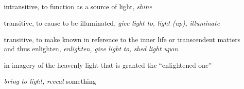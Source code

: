 			\subparagraph{\texorpdfstring{}{}}
				\label{PHOTIZO}
			
				\begin{compactdesc}
					\item[BDAG 955b] \textbf{}
						\begin{compactitem}
							\item[1] intransitive, to function as a source of light, \textit{shine}
							\item[2] transitive, to cause to be illuminated, \textit{give light to, light (up), illuminate}
							\item[3] transitive, to make known in reference to the inner life or transcendent matters and thus enlighten, \textit{enlighten, give light to, shed light upon}
							\item[3a] in imagery of the heavenly light that is granted the ``enlightened one''
							\item[3b] \textit{bring to light, reveal} something
						\end{compactitem}
				\end{compactdesc}
				
		
	
		
		
